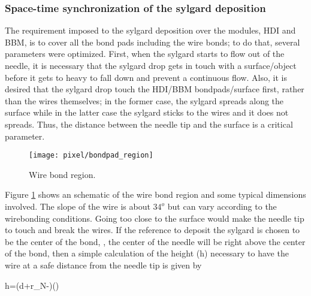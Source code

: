 \subsubsection*{Space-time synchronization of the sylgard deposition}

The requirement imposed to the sylgard deposition over the modules, HDI and BBM, is to cover all the bond pads including the wire bonds; to do that, several parameters were optimized. First, when the sylgard starts to flow out of the needle, it is necessary that the sylgard drop gets in touch with a surface/object before it gets to heavy to fall down and prevent a continuous flow. Also, it is desired that the sylgard drop touch the HDI/BBM bondpads/surface first, rather than the wires themselves; in the former case, the sylgard spreads along the surface while in the latter case the sylgard sticks to the wires and it does not spreads. Thus, the distance between the needle tip and the surface is a critical parameter.

\begin{figure}[h]
  \begin{center}
    \texttt{[image: pixel/bondpad\_region]}
    \caption[Wire bond region.]{Wire bond region.}\label{fig:bondpad_region}
  \end{center}
\end{figure}

Figure \ref{fig:bondpad_region} shows an schematic of the wire bond region and some typical dimensions involved. The slope of the wire is about $34^o$ but can vary according to the wirebonding conditions. Going too close to the surface would make the needle tip to touch and break the wires. If the reference to deposit the sylgard is chosen to be the center of the bond, \ie, the center of the needle will be right above the center of the bond, then a simple calculation of the height (h) necessary to have the wire at a safe distance from the needle tip is given by 

\beqn
h=\left(d+r_N-\right )\tan(\theta)
\eeqn

